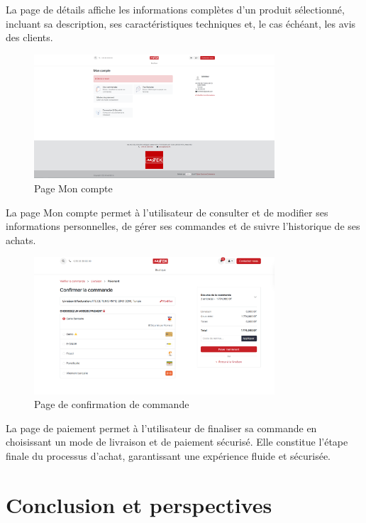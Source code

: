 \documentclass[12pt]{report}
\begin{document}
La page de détails affiche les informations complètes d’un produit sélectionné, incluant sa description, ses caractéristiques techniques et, le cas échéant, les avis des clients.

\begin{figure}[H]
    \centering
    \includegraphics[width=0.8\textwidth]{images/interfaces/page_mon_compte.PNG}
    \caption{Page \og Mon compte \fg}
    \label{fig:page_mon_compte}
\end{figure}

La page \og Mon compte \fg{} permet à l’utilisateur de consulter et de modifier ses informations personnelles, de gérer ses commandes et de suivre l’historique de ses achats.

\begin{figure}[H]
    \centering
    \includegraphics[width=0.8\textwidth]{images/interfaces/page_payer.PNG}
    \caption{Page de confirmation de commande}
    \label{fig:page_paiement}
\end{figure}

La page de paiement permet à l’utilisateur de finaliser sa commande en choisissant un mode de livraison et de paiement sécurisé. Elle constitue l’étape finale du processus d’achat, garantissant une expérience fluide et sécurisée.

\chapter{Conclusion et perspectives}
\end{document}
